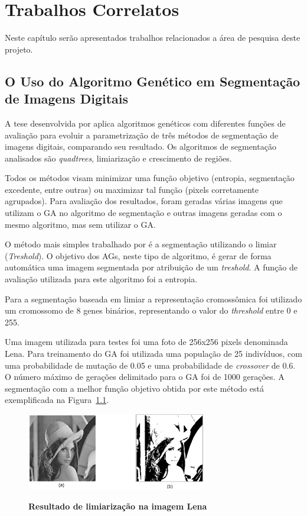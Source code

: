 \documentclass[12pt,oneside,a4paper,english,french,spanish,brazil,]{abntex2}
\begin{document}
\chapter{Trabalhos Correlatos}

Neste capítulo serão apresentados trabalhos relacionados a área de pesquisa deste projeto.


\section{O Uso do Algoritmo Genético em Segmentação de Imagens Digitais}

A tese desenvolvida por \citet{matias:2007} aplica algoritmos genéticos com diferentes funções de avaliação para evoluir a parametrização de três métodos de segmentação de imagens digitais, comparando seu resultado. Os algoritmos de segmentação analisados são \textit{quadtrees}, limiarização e crescimento de regiões.

Todos os métodos visam minimizar uma função objetivo (entropia, segmentação excedente, entre outras) ou maximizar tal função (pixels corretamente agrupados). Para avaliação dos resultados, foram geradas várias imagens que utilizam o GA no algoritmo de segmentação e outras imagens geradas com o mesmo algoritmo, mas sem utilizar o GA. 

O método mais simples trabalhado por \citet{matias:2007} é a segmentação utilizando o limiar (\textit{Treshold}). O objetivo dos AGs, neste tipo de algoritmo, é gerar de forma automática uma imagem segmentada por atribuição de um \textit{treshold}. A função de avaliação utilizada para este algoritmo foi a entropia.

Para a segmentação baseada em limiar a representação cromossômica foi utilizado um cromossomo de 8 genes binários, representando o valor do \textit{threshold} entre 0 e 255. 

Uma imagem utilizada para testes foi uma foto de 256x256 pixels denominada Lena. Para treinamento do GA foi utilizada uma população de 25 indivíduos, com uma probabilidade de mutação de 0.05 e uma probabilidade de \textit{crossover} de 0.6. O número máximo de gerações delimitado para o GA foi de 1000 gerações. A segmentação com a melhor função objetivo obtida por este método está exemplificada na Figura~\ref{fig:TrCo_Matias_Limiar_1}.

\begin{figure}[ht]
\centering
\caption{\textbf{Resultado de limiarização na imagem Lena}}
\includegraphics[width=0.7\textwidth]{imagens/TrCo_Matias_Limiar_1.PNG}
\label{fig:TrCo_Matias_Limiar_1}
\end{figure}
\end{document}
